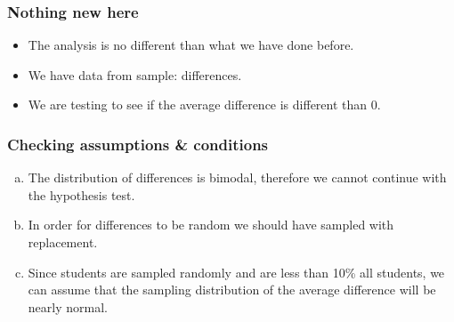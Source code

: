 
\begin{frame}
\frametitle{Nothing new here}

\begin{itemize}

\item The analysis is no different than what we have done before.

\item We have data from  sample: differences. 

\item We are testing to see if the average difference is different than 0.

\end{itemize}

\end{frame}


\begin{frame}
\frametitle{Checking assumptions \& conditions}


\begin{enumerate}[(a)]
\item The distribution of differences is bimodal, therefore we cannot continue with the hypothesis test.
\item In order for differences to be random we should have sampled with replacement.
\item Since students are sampled randomly and are less than 10\% all students, we can assume that the sampling distribution of the average difference will be nearly normal.
\end{enumerate}

\end{frame}


